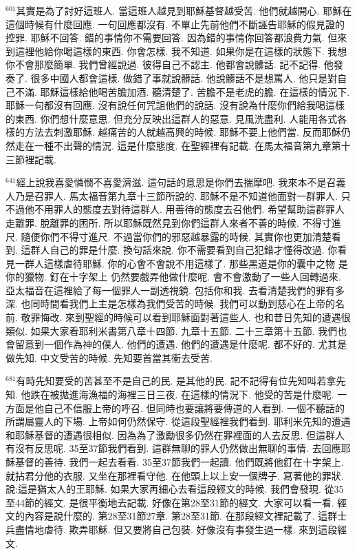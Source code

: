 \documentclass{book}
\begin{document}
$^{601}$其實是為了討好這班人.
當這班人越見到耶穌基督越受苦.
他們就越開心.
耶穌在這個時候有什麼回應.
一句回應都沒有.
不單止先前他們不斷誣告耶穌的假見證的控罪.
耶穌不回答.
錯的事情你不需要回答.
因為錯的事情你回答都浪費力氣.
但來到這裡他給你喝這樣的東西.
你會怎樣.
我不知道.
如果你是在這樣的狀態下.
我想你不會那麼簡單.
我們曾經說過.
彼得自己不認主.
他都會說髒話.
記不記得.
他發奏了.
很多中國人都會這樣.
做錯了事就說髒話.
他說髒話不是想罵人.
他只是對自己不滿.
耶穌這樣給他喝苦膽加酒.
聽清楚了.
苦膽不是老虎的膽.
在這樣的情況下.
耶穌一句都沒有回應.
沒有說任何咒詛他們的說話.
沒有說為什麼你們給我喝這樣的東西.
你們想什麼意思.
但充分反映出這群人的惡意.
見風洗盡利.
人能用各式各樣的方法去刺激耶穌.
越痛苦的人就越高興的時候.
耶穌不要上他們當.
反而耶穌仍然走在一種不出聲的情況.
這是什麼態度.
在聖經裡有記載.
在馬太福音第九章第十三節裡記載.

$^{641}$經上說我喜愛憐憫不喜愛濟滋.
這句話的意思是你們去揣摩吧.
我來本不是召義人乃是召罪人.
馬太福音第九章十三節所說的.
耶穌不是不知道他面對一群罪人.
只不過他不用罪人的態度去對待這群人.
用善待的態度去召他們.
希望幫助這群罪人走離罪.
脫離罪的困所.
所以耶穌既然見到你們這群人來者不善的時候.
不得寸進尺.
隨便你們不得寸進尺.
不過當你們的邪惡越暴露的時候.
其實你也更加清楚看到.
這群人自己的罪是什麼.
換句話來說.
你不需要看到自己犯錯才懂得改過.
你看見一群人這樣虐待耶穌.
你的心會不會說不用這樣了.
那些黑道是你的囊中之物 是你的獵物.
釘在十字架上 仍然要戲弄他做什麼呢.
會不會激動了一些人回轉過來.
亞太福音在這裡給了每一個罪人一副透視鏡.
包括你和我.
去看清楚我們的罪有多深.
也同時間看我們上主是怎樣為我們受苦的時候.
我們可以動到慈心在上帝的名前.
敬罪悔改.
來到聖經的時候可以看到耶穌面對著這些人.
也和昔日先知的遭遇很類似.
如果大家看耶利米書第八章十四節.
九章十五節.
二十三章第十五節.
我們也會留意到一個作為神的僕人.
他們的遭遇.
他們的遭遇是什麼呢.
都不好的.
尤其是做先知.
中文受苦的時候.
先知要首當其衝去受苦.

$^{681}$有時先知要受的苦甚至不是自己的民.
是其他的民.
記不記得有位先知叫若拿先知.
他跌在被拋進海漁福的海裡三日三夜.
在這樣的情況下.
他受的苦是什麼呢.
一方面是他自己不信服上帝的呼召.
但同時也要讓將要傳道的人看到.
一個不聽話的所謂屬靈人的下場.
上帝如何仍然保守.
從這段聖經裡我們看到.
耶利米先知的遭遇和耶穌基督的遭遇很相似.
因為為了激勵很多仍然在罪裡面的人去反思.
但這群人有沒有反思呢.
35至37節我們看到.
這群無聊的罪人仍然做出無聊的事情.
去回應耶穌基督的善待.
我們一起去看看.
35至37節我們一起讀.
他們既將他釘在十字架上.
就拈君分他的衣服.
又坐在那裡看守他.
在他頭上以上安一個牌子.
寫著他的罪狀.
說:這是猶太人的王耶穌.
如果大家再細心去看這段經文的時候.
我們會發現.
從35至44節的經文.
是很平衡地去記載.
好像在第28至31節的經文.
大家可以看一看.
經文的內容是說什麼的.
第28至31節27章.
第28至31節.
在那段經文裡記載了.
這群士兵盡情地虐待.
欺弄耶穌.
但又要將自己包裝.
好像沒有事發生過一樣.
來到這段經文.
\end{document}
